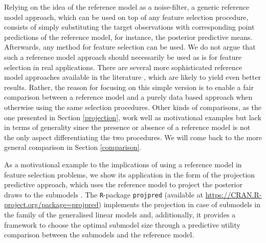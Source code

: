 \documentclass[american,]{article}
\theoremstyle{definition}
\begin{document}
Relying on the idea of the reference model as a noise-filter, a
generic reference model approach, which can be used on top of any
feature selection procedure, consists of simply substituting the
target observations with corresponding point predictions of the
reference model, for instance, the posterior predictive
means. Afterwards, any method for feature selection can be used. We do
not argue that such a reference model approach should necessarily be
used as is for feature selection in real applications. There are
several more sophisticated reference model approaches available in the
literature \cite[see,
e.g.][]{paper:projpred,paananen2017variable,paul2008preconditioning},
which are likely to yield even better results. Rather, the reason for
focusing on this simple version is to enable a fair comparison between
a reference model and a purely data based approach when otherwise
using the same selection procedures. Other kinds of comparisons, as
the one presented in Section \ref{projection}, work well as
motivational examples but lack in terms of generality since the
presence or absence of a reference model is not the only aspect
differentiating the two procedures. We will come back to the more
general comparison in Section \ref{comparison}.

As a motivational example to the implications of using a reference
model in feature selection problems, we show its application in the
form of the projection predictive approach, which uses the reference
model to project the posterior draws to the submodels
\citep{paper:original_proj}. The \texttt{R}-package \texttt{projpred}
(available at \url{https://CRAN.R-project.org/package=projpred})
implements the projection in case of submodels in the family of the
generalised linear models and, additionally, it provides a framework
to choose the optimal submodel size through a predictive utility
comparison between the submodels and the reference model.
\end{document}
